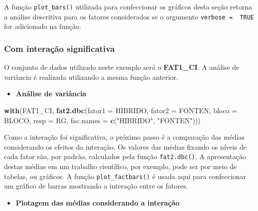 \documentclass[
]{book}
\newenvironment{Shaded}{\begin{snugshade}}{\end{snugshade}}
\newcommand{\DataTypeTok}[1]{\textcolor[rgb]{0.13,0.29,0.53}{#1}}
\newcommand{\KeywordTok}[1]{\textcolor[rgb]{0.13,0.29,0.53}{\textbf{#1}}}
\newcommand{\NormalTok}[1]{#1}
\newcommand{\StringTok}[1]{\textcolor[rgb]{0.31,0.60,0.02}{#1}}
\providecommand{\tightlist}{%
  \setlength{\itemsep}{0pt}\setlength{\parskip}{0pt}}
\begin{document}
\begin{dica}
A função \texttt{plot\_bars()} utilizada para confeccionar os gráficos desta seção retorna a análise descritiva para os fatores considerados se o argumento \texttt{verbose\ =\ \ TRUE} for adicionado na função.
\end{dica}

\hypertarget{com-interauxe7uxe3o-significativa}{%
\subsubsection{Com interação significativa}\label{com-interauxe7uxe3o-significativa}}


O conjunto de dados utilizado neste exemplo será o \textbf{FAT1\_CI}. A análise de variância é realizada utilizando a mesma função anterior.

\begin{itemize}
\tightlist
\item
  \textbf{Análise de variância}
\end{itemize}

\begin{Shaded}
\begin{Highlighting}[]
\KeywordTok{with}\NormalTok{(FAT1_CI,}
     \KeywordTok{fat2.dbc}\NormalTok{(}\DataTypeTok{fator1 =}\NormalTok{  HIBRIDO,}
              \DataTypeTok{fator2 =}\NormalTok{  FONTEN,}
              \DataTypeTok{bloco =}\NormalTok{ BLOCO,}
              \DataTypeTok{resp =}\NormalTok{  RG,}
              \DataTypeTok{fac.names =} \KeywordTok{c}\NormalTok{(}\StringTok{"HIBRIDO"}\NormalTok{, }\StringTok{"FONTEN"}\NormalTok{)))}
\end{Highlighting}
\end{Shaded}

Como a interação  foi significativa, o próximo passo é a comparação das médias considerando os efeitos da interação. Os valores das médias fixando os níveis de cada fator são, por padrão, calculados pela função \texttt{fat2.dbc()}. A apresentação destas médias em um trabalho científico, por exemplo, pode ser por meio de tabelas, ou gráficos. A função \texttt{plot\_factbars()} é usada aqui para confeccionar um gráfico de barras mostrando a interação entre os fatores.

\begin{itemize}
\tightlist
\item
  \textbf{Plotagem das médias considerando a interação}
\end{itemize}
\end{document}
